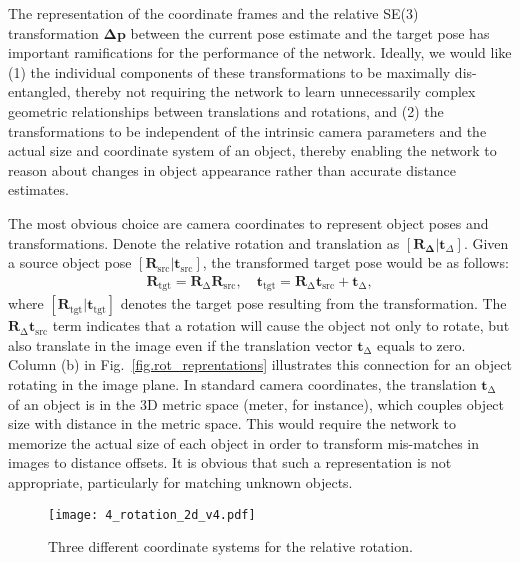\documentclass[twocolumn]{svjour3}
\begin{document}

The representation of the coordinate frames and the relative SE(3) transformation $\mathbf{\Delta p}$ between the current pose estimate and the target pose has important ramifications for the performance of the network.  Ideally, we would like (1) the individual components of these transformations to be maximally dis-entangled, thereby not requiring the network to learn unnecessarily complex geometric relationships between translations and rotations, and (2) the transformations to be independent of the intrinsic camera parameters and the actual size and coordinate system of an object, thereby enabling the network to reason about changes in object appearance rather than accurate distance estimates. 

The most obvious choice are camera coordinates to represent object poses and transformations. Denote the relative rotation and translation as $[\mathbf{R_\Delta}|\mathbf{t}_\Delta]$. Given a source object pose $[\mathbf{R}_{\text{src}}|\mathbf{t}_{\text{src}}]$, the transformed target pose would be as follows:
\begin{equation}
\begin{split}
\mathbf{R}_\text{tgt} = \mathbf{R}_\mathrm{\Delta} \mathbf{R}_\text{src}, \quad
\mathbf{t}_\text{tgt} = \mathbf{R}_\mathrm{\Delta} \mathbf{t}_\text{src}+\mathbf{t}_\mathrm{\Delta},
\end{split}
\label{eq.naive_transform}
\end{equation}
where $[\mathbf{R}_{\text{tgt}}|\mathbf{t}_{\text{tgt}}]$ denotes the target pose resulting from the transformation.
The $\mathbf{R}_\mathrm{\Delta} \mathbf{t}_\text{src}$ term indicates that a rotation will cause the object not only to rotate, but also translate in the image even if the translation vector $\mathbf{t}_\mathrm{\Delta}$ equals to zero. 
Column (b) in Fig.~\ref{fig.rot_reprentations} illustrates this connection for an object rotating in the image plane.  
In standard camera coordinates, the translation $\mathbf{t}_\mathrm{\Delta}$ of an object is in the 3D metric space (meter, for instance), which couples object size with distance in the metric space.  This would require the network to memorize the actual size of each object in order to transform mis-matches in images to distance offsets. It is obvious that such a representation is not appropriate, particularly for matching unknown objects. 
\begin{figure*}[t]
	\centering
	\texttt{[image: 4\_rotation\_2d\_v4.pdf]}
\caption{Three different coordinate systems for the relative rotation.}%
\label{fig.different_reprentation}
\end{figure*}
\fi
\end{document}
